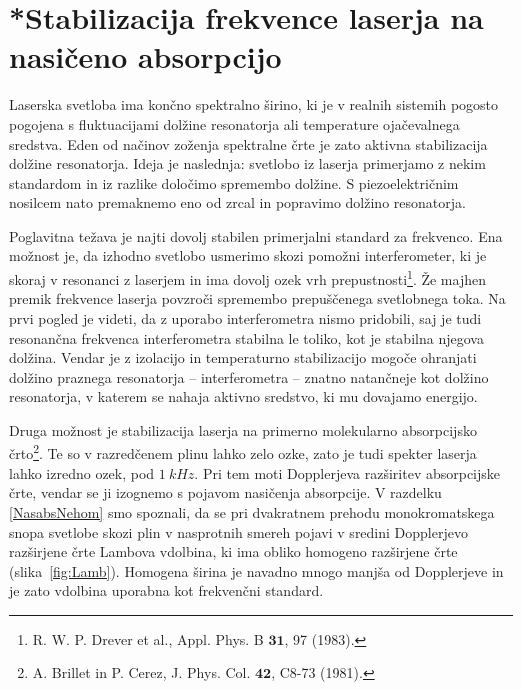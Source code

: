 \section{*Stabilizacija frekvence laserja na nasičeno absorpcijo}
\label{chap:stabilizacija}
Laserska svetloba ima končno spektralno širino, ki 
je v realnih sistemih pogosto pogojena s fluktuacijami dolžine resonatorja ali 
temperature ojačevalnega sredstva. Eden od načinov 
zoženja spektralne črte je zato aktivna stabilizacija
dolžine resonatorja. Ideja je naslednja: svetlobo iz laserja primerjamo
z nekim standardom in iz razlike določimo spremembo dolžine. S
piezoelektričnim nosilcem nato premaknemo eno od zrcal in popravimo 
dolžino resonatorja. 

Poglavitna težava je najti dovolj stabilen primerjalni standard za frekvenco. 
Ena možnost je, da izhodno svetlobo usmerimo skozi pomožni 
interferometer, 
ki je skoraj v resonanci z laserjem in ima dovolj ozek vrh 
prepustnosti\footnote{R. W. P. Drever et al., Appl. Phys. B $\mathbf{31}$, 97 (1983).}.
Že majhen 
premik frekvence laserja povzroči spremembo prepuščenega svetlobnega toka. 
Na prvi pogled je videti, da z uporabo interferometra nismo pridobili, 
saj je tudi resonančna frekvenca interferometra stabilna le toliko, kot je 
stabilna njegova dolžina. Vendar je z izolacijo in temperaturno stabilizacijo 
mogoče ohranjati dolžino praznega resonatorja -- interferometra -- znatno
natančneje kot dolžino resonatorja, v katerem se nahaja aktivno sredstvo, ki mu 
dovajamo energijo.

Druga možnost je stabilizacija laserja na primerno molekularno absorpcijsko
črto\footnote{A. Brillet in P. Cerez, J. Phys. Col. $\mathbf{42}$, C8-73 (1981).}.
Te so v razredčenem plinu lahko zelo ozke, zato je tudi spekter 
laserja lahko izredno ozek, pod $1~\si{kHz}$. 
Pri tem moti Dopplerjeva razširitev absorpcijske črte, vendar se ji
izognemo s pojavom nasičenja 
absorpcije. V razdelku
\ref{NasabsNehom} smo spoznali, da se pri dvakratnem prehodu
monokromatskega snopa svetlobe skozi plin v nasprotnih smereh pojavi v
sredini Dopplerjevo razširjene črte Lambova vdolbina, ki 
ima obliko homogeno razširjene črte (slika~\ref{fig:Lamb}). 
Homogena širina je navadno mnogo manjša od Dopplerjeve in
je zato vdolbina uporabna kot frekvenčni standard. 

